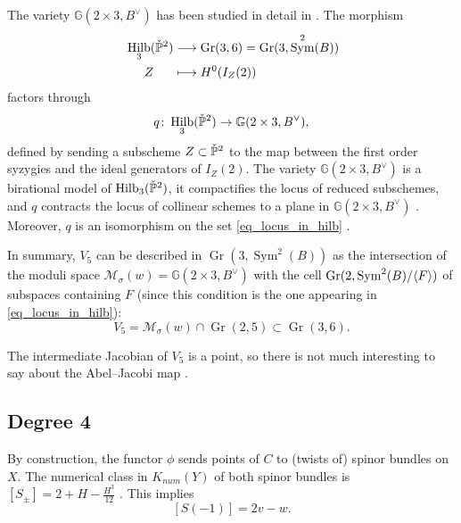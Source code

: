 \documentclass[11pt]{amsart}
\theoremstyle{definition}
\newcommand{\pr}[1]{\mathbb P^{#1}}
\DeclareMathOperator{\Sym}{Sym}
\DeclareMathOperator{\Gr}{Gr}
\DeclareMathOperator{\Hilb}{Hilb}
\newcommand{\sO}{\mathcal{O}}
\newcommand{\sM}{\mathcal{M}}
\newcommand{\AAA}[1]{\textcolor{red}{#1}}
\DeclarePairedDelimiter{\pair}{\langle}{\rangle}
\begin{document}
The variety $\mathbb{G}(2\times 3,B^\vee)$ has been studied in detail in \cite{Dre88}. The morphism 
\begin{align*}
 \Hilb_3(\Check{\mathbb{P}}^2)  &\longrightarrow  \Gr(3,6)= \Gr(3,\Sym^2(B))\\
      \phantom{aaa} Z \phantom{aaa} &\longmapsto  H^0(I_Z(2))
\end{align*}
factors through
\[ q\colon \Hilb_3(\Check{\mathbb{P}}^2) \to \mathbb G (2\times 3,B^\vee), \]
defined by sending a subscheme $Z\subset \Check{\mathbb P}^2$ to the map between the first order syzygies and the ideal generators of $I_Z(2)$. The variety $\mathbb G (2\times 3,B^\vee)$ is a birational model of $\Hilb_3(\Check{\mathbb{P}}^2)$, it compactifies the locus of reduced subschemes, and $q$ contracts the locus of collinear schemes to a plane in $\mathbb{G}(2\times 3, B^\vee)$ \cite[Theorem~4]{Dre88}. Moreover, $q$ is an isomorphism on the set \eqref{eq_locus_in_hilb} \cite[Lemma 2.3]{Fae05}. 

In summary, $V_5$ can be described in $\Gr(3,\Sym^2(B))$ as the intersection of the moduli space $\sM_\sigma(w)=\mathbb{G}(2\times 3, B^\vee)$ with the cell $\Gr(2,\Sym^2(B)/\pair{F})$ of subspaces containing $F$ (since this condition is the one appearing in \eqref{eq_locus_in_hilb}):
\[V_5=\sM_\sigma(w)\cap \Gr(2,5)\subset \Gr(3,6).\]

The intermediate Jacobian of $V_5$ is a point, so there is not much interesting to say about the Abel--Jacobi map \cite[Table 12.2]{AGV_Fano}. 





\subsection{Degree 4}


By construction, the functor $\phi$ sends points of $C$ to (twists of) spinor bundles on $X$. The numerical class in $K_{num}(Y)$ of both spinor bundles is $[S_\pm]=2+H-\frac{H^3}{12}$ \cite[Remark 2.9]{Ott88}. This implies \[[S(-1)]=2v-w.\]
\end{document}
